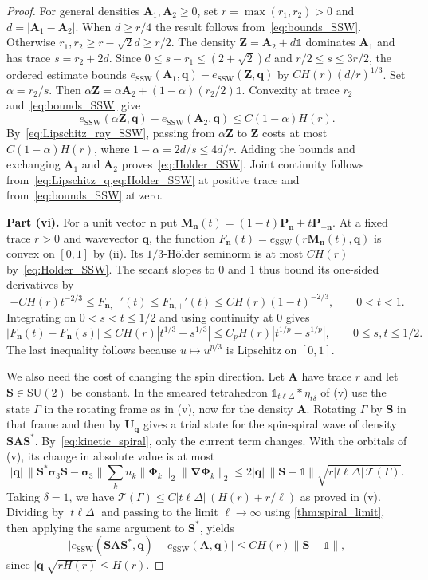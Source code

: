 \documentclass[final,reqno]{amsart}
\theoremstyle{remark}
\renewcommand{\le}{\leqslant}
\renewcommand{\ge}{\geqslant}
\newcommand{\SU}{\mathrm{SU}}
\newcommand{\SSW}{\mathrm{SSW}}
\newcommand{\iden}{\mathbb{1}}
\newcommand{\grad}{\bm{\nabla}}
\newcommand{\tetra}{\mathbb{\Delta}}
\newcommand{\TC}{\mathcal{T}}
\begin{document}
\begin{proof}
For general densities $\mathbf{A}_1,\mathbf{A}_2\ge0$, set $r=\max(r_1,r_2)>0$ and $d=|\mathbf{A}_1-\mathbf{A}_2|$. When $d\ge r/4$ the result follows from~\cref{eq:bounds_SSW}. Otherwise $r_1,r_2\ge r-\sqrt2d\ge r/2$. The density $\mathbf{Z}=\mathbf{A}_2+d\iden$ dominates $\mathbf{A}_1$ and has trace $s=r_2+2d$. Since $0\le s-r_1\le(2+\sqrt2)d$ and $r/2\le s\le 3r/2$, the ordered estimate bounds $e_\SSW(\mathbf{A}_1,\mathbf{q})-e_\SSW(\mathbf{Z},\mathbf{q})$ by $C H(r)(d/r)^{1/3}$. Set $\alpha=r_2/s$. Then $\alpha\mathbf{Z}=\alpha\mathbf{A}_2+(1-\alpha)(r_2/2)\iden$. Convexity at trace $r_2$ and~\cref{eq:bounds_SSW} give
$$
e_\SSW(\alpha\mathbf{Z},\mathbf{q})-e_\SSW(\mathbf{A}_2,\mathbf{q})\le C(1-\alpha)H(r).
$$
By~\cref{eq:Lipschitz_ray_SSW}, passing from $\alpha\mathbf{Z}$ to $\mathbf{Z}$ costs at most $C(1-\alpha)H(r)$, where $1-\alpha=2d/s\le4d/r$. Adding the bounds and exchanging $\mathbf{A}_1$ and $\mathbf{A}_2$ proves~\cref{eq:Holder_SSW}. Joint continuity follows from~\cref{eq:Lipschitz_q,eq:Holder_SSW} at positive trace and from~\cref{eq:bounds_SSW} at zero.

\medskip

\noindent\textbf{Part (vi).} For a unit vector $\mathbf{n}$ put $\mathbf{M}_{\mathbf{n}}(t)=(1-t)\mathbf{P}_{\mathbf{n}}+t\mathbf{P}_{-\mathbf{n}}$. At a fixed trace $r>0$ and wavevector $\mathbf{q}$, the function $F_{\mathbf{n}}(t)=e_\SSW(r\mathbf{M}_{\mathbf{n}}(t),\mathbf{q})$ is convex on $[0,1]$ by (ii). Its $1/3$-H\"older seminorm is at most $C H(r)$ by~\cref{eq:Holder_SSW}. The secant slopes to $0$ and $1$ thus bound its one-sided derivatives by
$$
-C H(r)t^{-2/3}\le F_{\mathbf{n},-}'(t)\le F_{\mathbf{n},+}'(t)\le C H(r)(1-t)^{-2/3},\qquad 0<t<1.
$$
Integrating on $0<s<t\le1/2$ and using continuity at $0$ gives
$$
|F_{\mathbf{n}}(t)-F_{\mathbf{n}}(s)|\le C H(r)|t^{1/3}-s^{1/3}|
\le C_p H(r)|t^{1/p}-s^{1/p}|,\qquad 0\le s,t\le1/2.
$$
The last inequality follows because $u\mapsto u^{p/3}$ is Lipschitz on $[0,1]$.

We also need the cost of changing the spin direction. Let $\mathbf{A}$ have trace $r$ and let $\mathbf{S}\in\SU(2)$ be constant. In the smeared tetrahedron $\iden_{t\ell\tetra}\ast\eta_{t\delta}$ of (v) use the state $\Gamma$ in the rotating frame as in (v), now for the density $\mathbf{A}$. Rotating $\Gamma$ by $\mathbf{S}$ in that frame and then by $\mathbf{U}_{\mathbf{q}}$ gives a trial state for the spin-spiral wave of density $\mathbf{S}\mathbf{A}\mathbf{S}^*$. By~\cref{eq:kinetic_spiral}, only the current term changes. With the orbitals of (v), its change in absolute value is at most
$$
|\mathbf{q}|\,\|\mathbf{S}^*\bm{\sigma}_3\mathbf{S}-\bm{\sigma}_3\|
\sum_k n_k\|\bm{\Phi}_k\|_2\|\grad\bm{\Phi}_k\|_2
\le 2|\mathbf{q}|\,\|\mathbf{S}-\iden\|\sqrt{r|t\ell\tetra|\,\TC(\Gamma)}.
$$
Taking $\delta=1$, we have $\TC(\Gamma)\le C|t\ell\tetra|\,(H(r)+r/\ell)$ as proved in (v). Dividing by $|t\ell\tetra|$ and passing to the limit $\ell\to\infty$ using \cref{thm:spiral_limit}, then applying the same argument to $\mathbf{S}^*$, yields
$$
\big|e_\SSW(\mathbf{S}\mathbf{A}\mathbf{S}^*,\mathbf{q})-e_\SSW(\mathbf{A},\mathbf{q})\big|\le C H(r)\|\mathbf{S}-\iden\|,
$$
since $|\mathbf{q}|\sqrt{rH(r)}\le H(r)$.


\end{proof}
\end{document}
